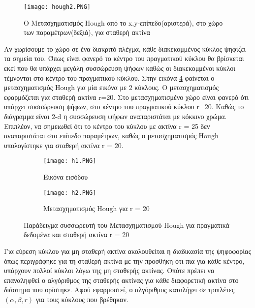 \begin{figure}[!h]
    \centering
      \texttt{[image: hough2.PNG]} \caption{Ο Μετασχηματισμός Hough από το x,y-επίπεδο(αριστερά), στο χώρο των παραμέτρων(δεξιά), για σταθερή ακτίνα}
\label{figure:circle}  
\end{figure}




Αν χωρίσουμε το χώρο σε ένα διακριτό πλέγμα, κάθε διακεκομμένος κύκλος ψηφίζει τα σημεία του. Όπως είναι φανερό το κέντρο του πραγματικού κύκλου θα βρίσκεται εκεί που θα υπάρχει μεγάλη συσσώρευση ψήφων καθώς οι διακεκομμένοι κύκλοι τέμνονται στο κέντρο του πραγματικού κύκλου.
Στην εικόνα \ref{figure:hough2} φαίνεται ο μετασχηματισμός Hough για μία εικόνα με 2 κύκλους. Ο μετασχηματισμός εφαρμόζεται για σταθερή ακτίνα r=20. Στο μετασχηματισμένο χώρο είναι φανερό ότι υπάρχει συσσώρευση ψήφων, στο κέντρο του πραγματικού κύκλου r=20. Καθώς το διάγραμμα είναι 2-d η συσσώρευση ψήφων αναπαριστάται με κόκκινο χρώμα. Επιπλέον, να σημειωθεί ότι το κέντρο του κύκλου με ακτίνα r = 25 δεν αναπαριστάται στο επίπεδο παραμέτρων, καθώς ο μετασχηματισμός Hough υπολογίστηκε για σταθερή ακτίνα r = 20.

\begin{figure}[!h]
\centering
\begin{subfigure}{.5\textwidth}
  \centering
  \texttt{[image: h1.PNG]}
  \caption{Εικόνα εισόδου}
  \label{fig:sub1bnew}
\end{subfigure}%
\begin{subfigure}{.4\textwidth}
  \centering
  \texttt{[image: h2.PNG]}
  \caption{Μετασχηματισμός Hough για r = 20}
  \label{fig:sub2bnew}
\end{subfigure}
\caption{ Παράδειγμα συσσωρευτή του Μετασχηματισμού Hough για πραγματικά δεδομένα και σταθερή ακτίνα r = 20}
\label{figure:hough2}
\end{figure}



Για εύρεση κύκλου για μη σταθερή ακτίνα ακολουθείται η διαδικασία της ψηφοφορίας 
όπως περιγράφηκε για τη σταθερή ακτίνα με την προσθήκη ότι πια για κάθε κέντρο, υπάρχουν πολλοί κύκλοι λόγω της μη σταθερής ακτίνας. Οπότε πρέπει να επαναληφθεί ο αλγόριθμος της σταθερής ακτίνας για κάθε διαφορετική ακτίνα στο διάστημα που ορίστηκε. Αφού εφαρμοστεί, ο αλγόριθμος καταλήγει σε τριπλέτες $(α,β,r)$ για τους κύκλους που βρέθηκαν.


